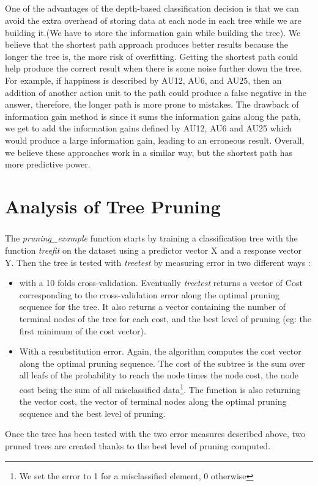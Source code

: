 \documentclass[a4paper,12pt,oneside,final]{report}
\begin{document}
\paragraph{}
One of the advantages of the depth-based classification decision is that we can avoid the extra overhead of storing data at each node in each tree while we are building it.(We have to store the information gain while building the tree).  We believe that the shortest path approach produces better results because the longer the tree is, the more risk of overfitting. Getting the shortest path could help produce the correct result when there is some noise further down the tree. For example, if happiness is described by AU12, AU6, and AU25, then an addition of another action unit to the path could produce a false negative in the answer, therefore, the longer path is more prone to mistakes. The drawback of information gain method is since it sums the information gains along the path, we get to add the information gains defined by AU12, AU6 and AU25 which would produce a large information gain, leading to an erroneous result. Overall, we believe these approaches work in a similar way, but the shortest path has more predictive power.

\chapter{Analysis of Tree Pruning}
\paragraph{}
The \textit{pruning\_example} function starts by training a classification tree with the function \textit{treefit} on the dataset using a predictor vector X and a response vector Y. Then the tree is tested with \textit{treetest} by measuring error in two different ways :
\begin{itemize}
\item with a 10 folds cross-validation. Eventually \textit{treetest} returns a vector of Cost corresponding to the cross-validation error along the optimal pruning sequence for the tree. It also returns a vector containing the number of terminal nodes of the tree for each cost, and the best level of pruning (eg: the first minimum of the cost vector).
\item With a resubstitution error. Again, the algorithm computes the cost vector along the optimal pruning sequence. The cost of the subtree is the sum over all leafs of the probability to reach the node times the node cost, the node cost being the sum of all misclassified data\footnote{We set the error to 1 for a misclassified element, 0 otherwise}.
The function is also returning the vector cost, the vector of terminal nodes along the optimal pruning sequence and the best level of pruning.
\end{itemize}
Once the tree has been tested with the two error measures described above, two pruned trees are created thanks to the best level of pruning computed.
\end{document}
